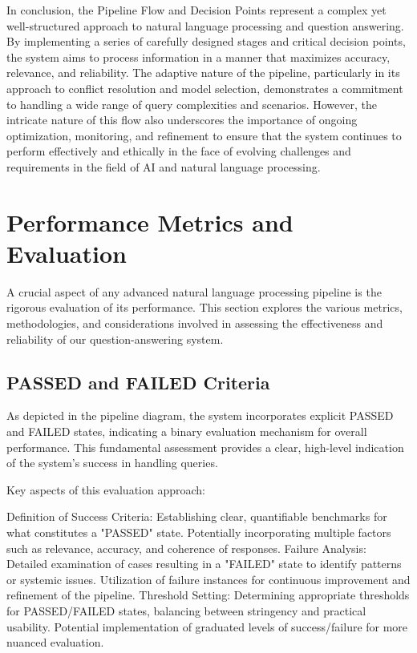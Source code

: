 In conclusion, the Pipeline Flow and Decision Points represent a complex yet well-structured approach to natural language processing and question answering.
By implementing a series of carefully designed stages and critical decision points, the system aims to process information in a manner that maximizes accuracy, relevance, and reliability.
The adaptive nature of the pipeline, particularly in its approach to conflict resolution and model selection, demonstrates a commitment to handling a wide range of query complexities and scenarios.
However, the intricate nature of this flow also underscores the importance of ongoing optimization, monitoring, and refinement to ensure that the system continues to perform effectively and ethically in the face of evolving challenges and requirements in the field of AI and natural language processing.


\section{Performance Metrics and Evaluation}\label{sec:performance-metrics-and-evaluation}
A crucial aspect of any advanced natural language processing pipeline is the rigorous evaluation of its performance. This section explores the various metrics, methodologies, and considerations involved in assessing the effectiveness and reliability of our question-answering system.

\subsection{PASSED and FAILED Criteria}\label{subsec:passed-and-failed-criteria}

As depicted in the pipeline diagram, the system incorporates explicit PASSED and FAILED states, indicating a binary evaluation mechanism for overall performance. This fundamental assessment provides a clear, high-level indication of the system's success in handling queries.

Key aspects of this evaluation approach:

Definition of Success Criteria:
Establishing clear, quantifiable benchmarks for what constitutes a "PASSED" state.
Potentially incorporating multiple factors such as relevance, accuracy, and coherence of responses.
Failure Analysis:
Detailed examination of cases resulting in a "FAILED" state to identify patterns or systemic issues.
Utilization of failure instances for continuous improvement and refinement of the pipeline.
Threshold Setting:
Determining appropriate thresholds for PASSED/FAILED states, balancing between stringency and practical usability.
Potential implementation of graduated levels of success/failure for more nuanced evaluation.

